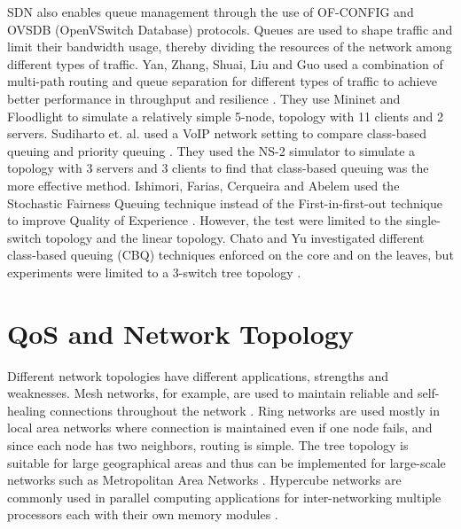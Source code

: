 SDN also enables queue management through the use of OF-CONFIG \cite{bansal_-config_2014} and OVSDB (OpenVSwitch Database) \cite{pfaff_rfc_2013} protocols. Queues are used to shape traffic and limit their bandwidth usage, thereby dividing the resources of the network among different types of traffic. Yan, Zhang, Shuai, Liu and Guo used a combination of multi-path routing and queue separation for different types of traffic to achieve better performance in throughput and resilience \cite{yan_hiqos_2015}. They use Mininet and Floodlight to simulate a relatively simple 5-node, topology with 11 clients and 2 servers. Sudiharto et. al. used a VoIP network setting to compare class-based queuing and priority queuing \cite{sudiharto_comparative_2015}. They used the NS-2 simulator to simulate a topology with 3 servers and 3 clients to find that class-based queuing was the more effective method. Ishimori, Farias, Cerqueira and Abelem used the Stochastic Fairness Queuing technique instead of the First-in-first-out technique to improve Quality of Experience \cite{ishimori_control_2013}. However, the test were limited to the single-switch topology and the linear topology. Chato and Yu investigated different class-based queuing (CBQ) techniques enforced on the core and on the leaves, but experiments were limited to a 3-switch tree topology \cite{chato_exploration_2016}.

\section{QoS and Network Topology}
Different network topologies have different applications, strengths and weaknesses. Mesh networks, for example, are used to maintain reliable and self-healing connections throughout the network \cite{chawla_fault_2015}. Ring networks are used mostly in local area networks where connection is maintained even if one node fails, and since each node has two neighbors, routing is simple. The tree topology is suitable for large geographical areas and thus can be implemented for large-scale networks such as Metropolitan Area Networks \cite{gerla_tree_1988}. Hypercube networks are commonly used in parallel computing applications for inter-networking multiple processors each with their own memory modules \cite{yan_fundamentals_2009}.


